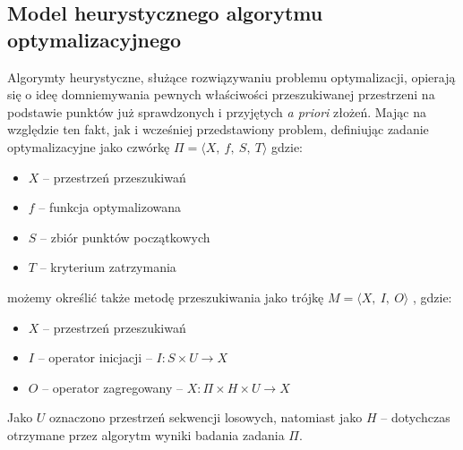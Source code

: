 \documentclass[12pt,a4paper]{report}
\begin{document}
{\subsection{Model heurystycznego algorytmu optymalizacyjnego}
\label{Model}
\par{
Algorymty heurystyczne, służące rozwiązywaniu problemu optymalizacji, opierają się o ideę domniemywania pewnych właściwości przeszukiwanej przestrzeni na podstawie punktów już sprawdzonych i przyjętych \emph{a priori} złożeń. Mając na względzie ten fakt, jak i wcześniej przedstawiony problem, definiując \cite{SearchingInteligent} zadanie optymalizacyjne jako czwórkę $\Pi = \langle{}X,~f,~S,~T\rangle$ gdzie:
\begin{itemize}
\item $X$ -- przestrzeń przeszukiwań
\item $f$ -- funkcja optymalizowana
\item $S$ -- zbiór punktów początkowych 
\item $T$ -- kryterium zatrzymania
\end{itemize}
możemy określić także metodę przeszukiwania jako trójkę $M = \langle{}X,~I,~O\rangle$ \cite{SearchingInteligent}, gdzie:
\begin{itemize}
\item $X$ -- przestrzeń przeszukiwań 
\item $I$ -- operator inicjacji -- $I: S \times U \rightarrow X$
\item $O$ -- operator zagregowany -- $X: \Pi \times H \times U \rightarrow X$
\end{itemize}
Jako $U$ oznaczono przestrzeń sekwencji losowych, natomiast jako $H$ -- dotychczas otrzymane przez algorytm wyniki badania zadania $\Pi$.
}

}
\end{document}
